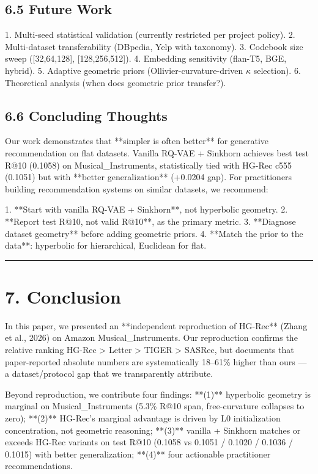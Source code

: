 \documentclass[11pt]{article}
\begin{document}
\subsection{6.5 Future Work}

1. Multi-seed statistical validation (currently restricted per project policy).
2. Multi-dataset transferability (DBpedia, Yelp with taxonomy).
3. Codebook size sweep ([32,64,128], [128,256,512]).
4. Embedding sensitivity (flan-T5, BGE, hybrid).
5. Adaptive geometric priors (Ollivier-curvature-driven $\kappa$ selection).
6. Theoretical analysis (when does geometric prior transfer?).


\subsection{6.6 Concluding Thoughts}

Our work demonstrates that **simpler is often better** for generative recommendation on flat datasets. Vanilla RQ-VAE + Sinkhorn achieves best test R@10 (0.1058) on Musical\_Instruments, statistically tied with HG-Rec c555 (0.1051) but with **better generalization** (+0.0204 gap). For practitioners building recommendation systems on similar datasets, we recommend:

1. **Start with vanilla RQ-VAE + Sinkhorn**, not hyperbolic geometry.
2. **Report test R@10, not valid R@10**, as the primary metric.
3. **Diagnose dataset geometry** before adding geometric priors.
4. **Match the prior to the data**: hyperbolic for hierarchical, Euclidean for flat.

\noindent\rule{\textwidth}{0.4pt}


\section{7. Conclusion}

In this paper, we presented an **independent reproduction of HG-Rec** (Zhang et al., 2026) on Amazon Musical\_Instruments. Our reproduction confirms the relative ranking HG-Rec > Letter > TIGER > SASRec, but documents that paper-reported absolute numbers are systematically 18–61\% higher than ours — a dataset/protocol gap that we transparently attribute.

Beyond reproduction, we contribute four findings: **(1)** hyperbolic geometry is marginal on Musical\_Instruments (5.3\% R@10 span, free-curvature collapses to zero); **(2)** HG-Rec's marginal advantage is driven by L0 initialization concentration, not geometric reasoning; **(3)** vanilla + Sinkhorn matches or exceeds HG-Rec variants on test R@10 (0.1058 vs 0.1051 / 0.1020 / 0.1036 / 0.1015) with better generalization; **(4)** four actionable practitioner recommendations.
\end{document}
